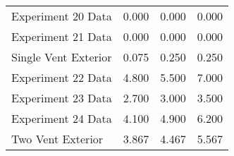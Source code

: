 \begin{tabular}{lrrr}
Experiment 20 Data   &            0.000 &            0.000 &      0.000 \\
Experiment 21 Data   &            0.000 &            0.000 &      0.000 \\
Single Vent Exterior &            0.075 &            0.250 &      0.250 \\
Experiment 22 Data   &            4.800 &            5.500 &      7.000 \\
Experiment 23 Data   &            2.700 &            3.000 &      3.500 \\
Experiment 24 Data   &            4.100 &            4.900 &      6.200 \\
Two Vent Exterior    &            3.867 &            4.467 &      5.567 \\
\bottomrule
\end{tabular}
